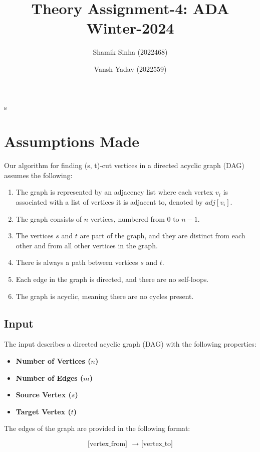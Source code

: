 s\documentclass{article}
\title{\fontsize{70}{40}\selectfont\textbf{Theory Assignment-4: ADA Winter-2024}}
\author{\Large Shamik Sinha (2022468) \and \Large Vansh Yadav (2022559)}
\date{}
\begin{document}
\maketitle


\section*{\large{Assumptions Made}}

Our algorithm for finding (s, t)-cut vertices in a directed acyclic graph (DAG) assumes the following:

\begin{enumerate}
    \item The graph is represented by an adjacency list where each vertex \(v_i\) is associated with a list of vertices it is adjacent to, denoted by \(adj[v_i]\).
    \item The graph consists of \(n\) vertices, numbered from \(0\) to \(n-1\).
    \item The vertices \(s\) and \(t\) are part of the graph, and they are distinct from each other and from all other vertices in the graph.
    \item There is always a path between vertices \(s\) and \(t\).
    \item Each edge in the graph is directed, and there are no self-loops.
    \item The graph is acyclic, meaning there are no cycles present.
\end{enumerate}


\subsection*{\Large{Input}}

The input describes a directed acyclic graph (DAG) with the following properties:

\begin{itemize}
    \item \textbf{Number of Vertices (\( n \))} 
    \item \textbf{Number of Edges (\( m \))} 
    \item \textbf{Source Vertex (\( s \))} 
    \item \textbf{Target Vertex (\( t \))} 
\end{itemize}

The edges of the graph are provided in the following format:

\[
\text{{[vertex\_from]} \(\rightarrow\) [vertex\_to]}
\]
\end{document}
